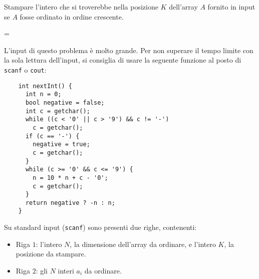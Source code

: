 \usepackage{xcolor}
\usepackage{afterpage}
\usepackage{pifont,mdframed}
\usepackage[bottom]{footmisc}
\usepackage{minted}


\renewcommand{\inputfile}{\texttt{stdin}}
\renewcommand{\outputfile}{\texttt{stdout}}
\makeatletter
\renewcommand{\this@inputfilename}{\texttt{stdin}}
\renewcommand{\this@outputfilename}{\texttt{stdout}}
\makeatother


\newenvironment{warning}
  {\par\begin{mdframed}[linewidth=2pt,linecolor=gray]%
    \begin{list}{}{\leftmargin=1cm
                   \labelwidth=\leftmargin}\item[\Large\ding{43}]}
  {\end{list}\end{mdframed}\par}


Stampare l'intero che si troverebbe nella posizione $K$ dell'array $A$ fornito in
input se $A$ fosse ordinato in ordine crescente.

\begin{warning}
L'input di questo problema è molto grande. Per non superare il tempo limite con
la sola lettura dell'input, si consiglia di usare la seguente funzione al posto di
\texttt{scanf} o \texttt{cout}:
  \begin{verbatim}
    int nextInt() {
      int n = 0;
      bool negative = false;
      int c = getchar();
      while ((c < '0' || c > '9') && c != '-')
        c = getchar();
      if (c == '-') {
        negative = true;
        c = getchar();
      }
      while (c >= '0' && c <= '9') {
        n = 10 * n + c - '0';
        c = getchar();
      }
      return negative ? -n : n;
    }
  \end{verbatim}
\end{warning}



\InputFile
Su standard input (\texttt{scanf}) sono presenti due righe, contenenti:
\begin{itemize}[nolistsep,itemsep=2mm]
\item Riga $1$: l'intero $N$, la dimensione dell'array da ordinare, e l'intero $K$, la posizione da stampare.
\item Riga $2$: gli $N$ interi $a_i$ da ordinare.
\end{itemize}

